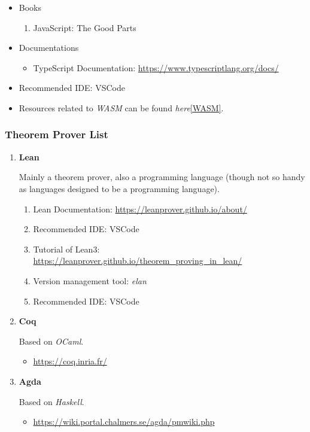 \documentclass{article}
\begin{document}
\begin{itemize}
\begin{itemize}
    \item Books
    \begin{enumerate}
        \item JavaScript: The Good Parts
        \cite{crockford2008javascript}
    \end{enumerate}
    \item Documentations
    \begin{itemize}
        \item TypeScript Documentation:
        \href{https://www.typescriptlang.org/docs/}{https://www.typescriptlang.org/docs/}
    \end{itemize}
    \item Recommended IDE: VSCode
    \item Resources related to \emph{WASM} can be found \emph{here}\ref{WASM}.
\end{itemize}

\end{itemize}

\subsubsection{Theorem Prover List}
\begin{enumerate}
\item \textbf{Lean}

Mainly a theorem prover, also a programming language (though not so handy as languages designed to be a programming language).

\begin{enumerate}
    \item Lean Documentation:
    \href{https://leanprover.github.io/about/}{https://leanprover.github.io/about/}
    \item Recommended IDE: VSCode
    \item Tutorial of Lean3:\\
    \href{https://leanprover.github.io/theorem_proving_in_lean/}{https://leanprover.github.io/theorem_proving_in_lean/}
    \item Version management tool: \emph{elan}
    \item Recommended IDE: VSCode
\end{enumerate}

\item \textbf{Coq}

    Based on \emph{OCaml}.
    \begin{itemize}
        \item \href{https://coq.inria.fr/}{https://coq.inria.fr/}
    \end{itemize}

\item \textbf{Agda}

    Based on \emph{Haskell}.
    \begin{itemize}
        \item \href{https://wiki.portal.chalmers.se/agda/pmwiki.php}{https://wiki.portal.chalmers.se/agda/pmwiki.php}
    \end{itemize}
\end{enumerate}
    
\end{document}
